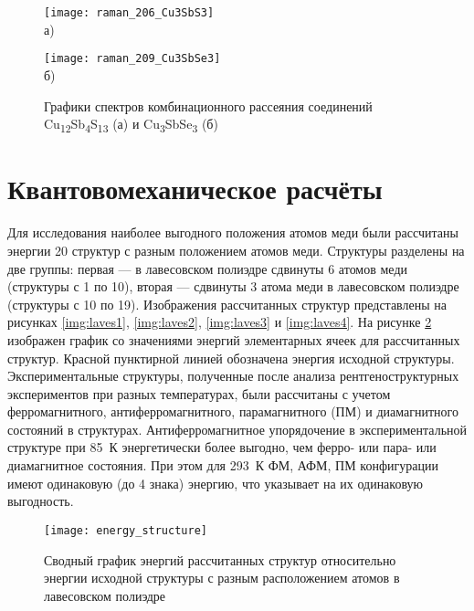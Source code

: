 \begin{figure}[p!]
  \begin{minipage}[ht]{0.9\linewidth}\centering
    \texttt{[image: raman\_206\_Cu3SbS3]} \\ а)
  \end{minipage}
  \vfill
  \begin{minipage}[ht]{0.9\linewidth}\centering
    \texttt{[image: raman\_209\_Cu3SbSe3]} \\ б)
  \end{minipage}

      \caption[Графики спектров комбинационного рассеяния соединений Cu\textsubscript{12}Sb\textsubscript{4}S\textsubscript{13} (а) и Cu\textsubscript{3}SbSe\textsubscript{3} (б)]{Графики спектров комбинационного рассеяния соединений Cu\textsubscript{12}Sb\textsubscript{4}S\textsubscript{13} (а) и Cu\textsubscript{3}SbSe\textsubscript{3} (б)}
    \label{img:raman2}
\end{figure}


\newpage


\section{Квантовомеханическое расчёты} \label{sect3_6}

Для исследования наиболее выгодного положения атомов меди были рассчитаны энергии 20 структур с разным положением атомов меди.
Структуры разделены на две группы: первая --- в лавесовском полиэдре сдвинуты 6 атомов меди (структуры с 1 по 10), вторая --- сдвинуты 3 атома меди в лавесовском полиэдре (структуры с 10 по 19). Изображения рассчитанных структур представлены на рисунках \ref{img:laves1}, \ref{img:laves2}, \ref{img:laves3} и \ref{img:laves4}.
На рисунке \ref{img:th} изображен график со значениями энергий элементарных ячеек для рассчитанных структур. Красной пунктирной линией обозначена энергия исходной структуры.
Экспериментальные структуры, полученные после анализа рентгеноструктурных экспериментов при разных температурах, были рассчитаны с учетом ферромагнитного, антиферромагнитного, парамагнитного (ПМ) и диамагнитного состояний в структурах.
Антиферромагнитное упорядочение в экспериментальной структуре при 85~К энергетически более выгодно, чем ферро- или пара- или диамагнитное состояния. При этом для 293~К ФМ, АФМ, ПМ конфигурации имеют одинаковую (до 4 знака) энергию, что указывает на их одинаковую выгодность.

\begin{figure}[ht!]
  \begin{minipage}[ht]{0.9\linewidth}\centering
    \texttt{[image: energy\_structure]}
  \end{minipage}

      \caption[Сводный график энергий рассчитанных структур относительно энергии исходной структуры с разным расположением атомов в лавесовском полиэдре]{Сводный график энергий рассчитанных структур относительно энергии исходной структуры с разным расположением атомов в лавесовском полиэдре}
    \label{img:th}
\end{figure}

